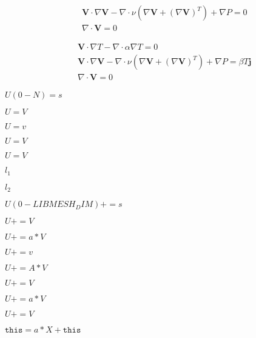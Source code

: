 \documentclass{article}
\begin{document}
\begin{eqnarray*}
&& \mathbf{V} \cdot \nabla \mathbf{V} - \nabla \cdot \nu (\nabla \mathbf{V} +(\nabla \mathbf{V})^T)
+\nabla P = 0 \\
&& \nabla \cdot \mathbf{V} = 0
\end{eqnarray*}
\pagebreak

\begin{eqnarray*}
&& \mathbf{V} \cdot \nabla T - \nabla \cdot\alpha \nabla T = 0 \\
&& \mathbf{V} \cdot \nabla \mathbf{V} - \nabla \cdot \nu (\nabla \mathbf{V} +(\nabla \mathbf{V})^T)
+\nabla P = \beta T \mathbf{j} \\
&& \nabla \cdot \mathbf{V} = 0
\end{eqnarray*}
\pagebreak

$U(0-N) = s$
\pagebreak

$U = V$
\pagebreak

$ U=v $
\pagebreak

$U=V$
\pagebreak

$ U=V $
\pagebreak

$l_1$
\pagebreak

$l_2$
\pagebreak

$U(0-LIBMESH_DIM)+=s$
\pagebreak

$U+=V$
\pagebreak

$U+=a*V$
\pagebreak

$ U+=v $
\pagebreak

$U+=A*V$
\pagebreak

$ U+=V $
\pagebreak

$ U+=a*V $
\pagebreak

$U+=V $
\pagebreak

$\texttt{this} = a*X + \texttt{this} $
\pagebreak
\end{document}
